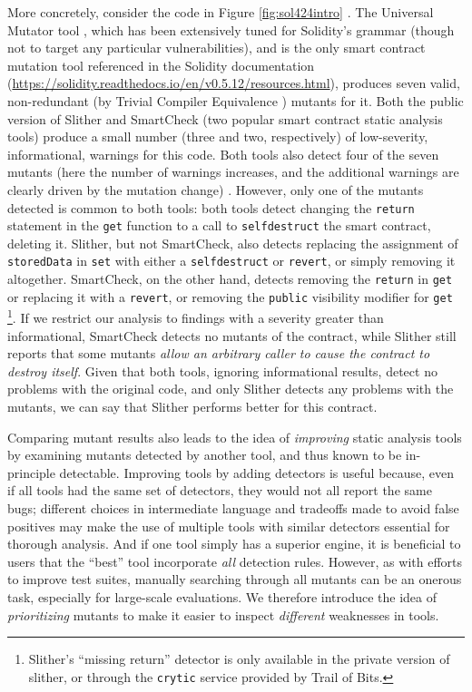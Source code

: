 More concretely, consider the code in Figure \ref{fig:sol424intro} \cite{solintro}.  The Universal Mutator tool \cite{universalmutator,regexpMut}, which has been extensively tuned for Solidity's grammar (though not to target any particular vulnerabilities), and is the only smart contract mutation tool referenced in the Solidity documentation (\url{https://solidity.readthedocs.io/en/v0.5.12/resources.html}), produces seven valid, non-redundant (by Trivial Compiler Equivalence \cite{TCE}) mutants for it.  Both the public version of Slither \cite{slither} and SmartCheck \cite{smartcheck} (two popular smart contract static analysis tools) produce a small number (three and two, respectively) of low-severity, informational, warnings for this code.  Both tools also detect four of the seven mutants (here the number of warnings increases, and the additional warnings are clearly driven by the mutation change) .  However, only one of the mutants detected is common to both tools: both tools detect changing the {\tt return} statement in the {\tt get} function to a call to {\tt selfdestruct} the smart contract, deleting it.  Slither, but not SmartCheck, also detects replacing the assignment of {\tt storedData} in {\tt set} with either a {\tt selfdestruct} or {\tt revert}, or simply removing it altogether.  SmartCheck, on the other hand, detects removing the {\tt return} in {\tt get} or replacing it with a {\tt revert}, or removing the {\tt public} visibility modifier for {\tt get} \footnote{Slither's ``missing return'' detector is only available in the private version of slither, or through the {\tt crytic} service provided by Trail of Bits.}.  If we restrict our analysis to findings with a severity greater than informational, SmartCheck detects no mutants of the contract, while Slither still reports that some mutants \emph{allow an arbitrary caller to cause the contract to destroy itself}.  Given that both tools, ignoring informational results, detect no problems with the original code, and only Slither detects any problems with the mutants, we can say that Slither performs better for this contract.

Comparing mutant results also leads to the idea of \emph{improving} static analysis tools by examining mutants detected by another tool, and thus known to be in-principle detectable.  Improving tools by adding detectors is useful because, even if all tools had the same set of detectors, they would not all report the same bugs; different choices in intermediate language and tradeoffs made to avoid false positives may make the use of multiple tools with similar detectors essential for thorough analysis.  And if one tool simply has a superior engine, it is beneficial to users that the ``best'' tool incorporate \emph{all} detection rules.
However, as with efforts to improve test suites, manually searching through all mutants can be an onerous task, especially for large-scale evaluations.  We therefore introduce the idea of \emph{prioritizing} mutants to make it easier to inspect \emph{different} weaknesses in tools.

